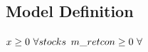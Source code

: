 \documentclass[11pt]{article}
\begin{document}
\subsection*{Model Definition}

\bigskip
$x\geq 0 ~ \forall stocks\\$
$m\_retcon\geq 0 ~ \forall \\$
\end{document}
